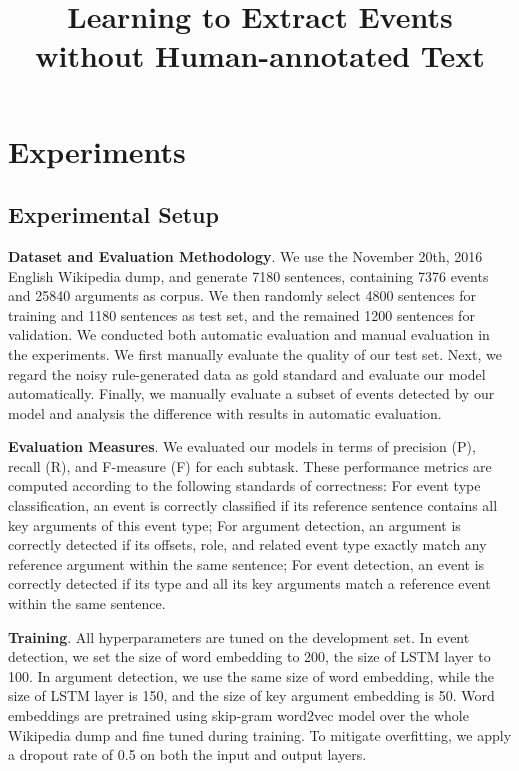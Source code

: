 \documentclass{article}
\title{Learning to Extract Events without Human-annotated Text}
\begin{document}
\maketitle









\section{Experiments}
\subsection{Experimental Setup}
\textbf{Dataset and Evaluation Methodology}. We use the November 20th, 2016 English Wikipedia dump, and generate 7180 sentences, containing 7376 events and 25840 arguments as corpus. We then randomly select 4800 sentences for training and 1180 sentences as test set, and the remained 1200 sentences for validation. We conducted both automatic evaluation and manual evaluation in the experiments. We first manually evaluate the quality of our test set. Next, we regard the noisy rule-generated data as gold standard and evaluate our model automatically. Finally, we manually evaluate a subset of events detected by our model and analysis the difference with results in automatic evaluation.

\noindent \textbf{Evaluation Measures}. We evaluated our models in terms of precision (P), recall (R), and F-measure (F) for each subtask. These performance metrics are computed according to the following standards of correctness: For event type classification, an event is correctly classified if its reference sentence contains all key arguments of this event type; For argument detection, an argument is correctly detected if its offsets, role, and related event type exactly match any reference argument within the same sentence; For event detection, an event is correctly detected if its type and all its key arguments match a reference event within the same sentence.

\noindent \textbf{Training}. All hyperparameters are tuned on the development set. In event detection, we set the size of word embedding to 200, the size of LSTM layer to 100. In argument detection, we use the same size of word embedding, while the size of LSTM layer is 150, and the size of key argument embedding is 50. Word embeddings are pretrained using skip-gram word2vec model \cite{mikolov2013distributed} over the whole Wikipedia dump and fine tuned during training. To mitigate overfitting, we apply a dropout rate of 0.5 on both the input and output layers. 
\end{document}
